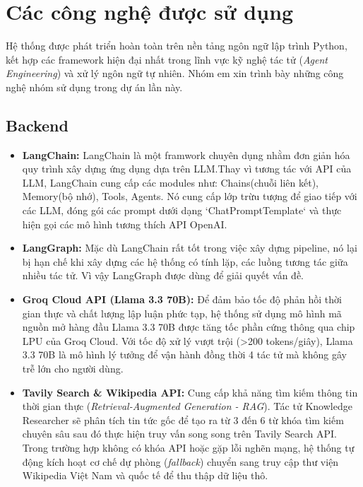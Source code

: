 \documentclass[12pt,a4paper]{report}
\begin{document}
\section{Các công nghệ được sử dụng}
Hệ thống được phát triển hoàn toàn trên nền tảng ngôn ngữ lập trình Python, kết hợp các framework hiện đại nhất trong lĩnh vực kỹ nghệ tác tử (\textit{Agent Engineering}) và xử lý ngôn ngữ tự nhiên. Nhóm em xin trình bày những công nghệ nhóm sử dụng trong dự án lần này.

\subsection{Backend}
\begin{itemize}
    
    \item \textbf{LangChain:} LangChain là một framwork chuyên dụng nhằm đơn giản hóa quy trình xây dựng ứng dụng dựa trên LLM.Thay vì tương tác với API của LLM, LangChain cung cấp các modules như: Chains(chuỗi liên kết), Memory(bộ nhớ), Tools, Agents. Nó cung cấp lớp trừu tượng để giao tiếp với các LLM, đóng gói các prompt dưới dạng `ChatPromptTemplate` và thực hiện gọi các mô hình tương thích API OpenAI.

    \item \textbf{LangGraph:} Mặc dù LangChain rất tốt trong việc xây dựng pipeline, nó lại bị hạn chế khi xây dựng các hệ thống có tính lặp, các luồng tương tác giữa nhiều tác tử. Vì vậy LangGraph được dùng để giải quyết vấn đề.
    
    \item \textbf{Groq Cloud API (Llama 3.3 70B):} Để đảm bảo tốc độ phản hồi thời gian thực và chất lượng lập luận phức tạp, hệ thống sử dụng mô hình mã nguồn mở hàng đầu Llama 3.3 70B được tăng tốc phần cứng thông qua chip LPU của Groq Cloud. Với tốc độ xử lý vượt trội (>200 tokens/giây), Llama 3.3 70B là mô hình lý tưởng để vận hành đồng thời 4 tác tử mà không gây trễ lớn cho người dùng.
    
    \item \textbf{Tavily Search \& Wikipedia API:} Cung cấp khả năng tìm kiếm thông tin thời gian thực (\textit{Retrieval-Augmented Generation - RAG}). Tác tử Knowledge Researcher sẽ phân tích tin tức gốc để tạo ra từ 3 đến 6 từ khóa tìm kiếm chuyên sâu sau đó thực hiện truy vấn song song trên Tavily Search API. Trong trường hợp không có khóa API hoặc gặp lỗi nghẽn mạng, hệ thống tự động kích hoạt cơ chế dự phòng (\textit{fallback}) chuyển sang truy cập thư viện Wikipedia Việt Nam và quốc tế để thu thập dữ liệu thô.
\end{itemize}
\end{document}
